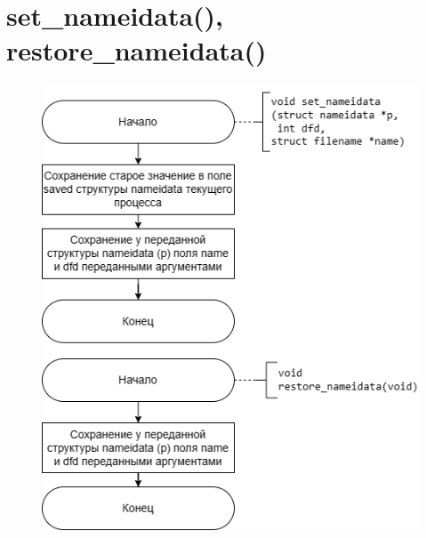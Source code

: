 \documentclass[12pt]{report}
\begin{document}
	\section{set\_nameidata(), restore\_nameidata()}
	
			\begin{figure}[H]
		\centering
		\includegraphics[scale=0.9]{set_nameidata}
	\end{figure}
	
	
	
	
	
	
	
	
	
	
	
	
	
	
	
\end{document}
